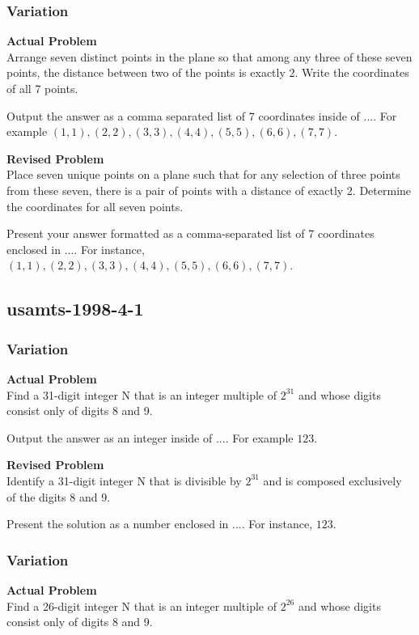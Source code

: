 \subsubsection{Variation}
\textbf{Actual Problem}\\
Arrange seven distinct points in the plane so that among any three of these seven points, the distance between two of the points is exactly 2.
Write the coordinates of all 7 points.

Output the answer as a comma separated list of 7 coordinates inside of $\boxed{...}$. For example $\boxed{(1, 1), (2, 2), (3, 3), (4, 4), (5, 5), (6, 6), (7, 7)}$.

\textbf{Revised Problem}\\
Place seven unique points on a plane such that for any selection of three points from these seven, there is a pair of points with a distance of exactly 2. Determine the coordinates for all seven points.

Present your answer formatted as a comma-separated list of 7 coordinates enclosed in $\boxed{...}$. For instance, $\boxed{(1, 1), (2, 2), (3, 3), (4, 4), (5, 5), (6, 6), (7, 7)}$.

\subsection{usamts-1998-4-1}
\subsubsection{Variation}
\textbf{Actual Problem}\\
Find a 31-digit integer N that is an integer multiple of $2^{ 31 }$ and whose digits consist only of digits 8 and 9.

Output the answer as an integer inside of $\boxed{...}$. For example $\boxed{123}$.

\textbf{Revised Problem}\\
Identify a 31-digit integer N that is divisible by $2^{31}$ and is composed exclusively of the digits 8 and 9.

Present the solution as a number enclosed in $\boxed{...}$. For instance, $\boxed{123}$.

\subsubsection{Variation}
\textbf{Actual Problem}\\
Find a 26-digit integer N that is an integer multiple of $2^{ 26 }$ and whose digits consist only of digits 8 and 9.

